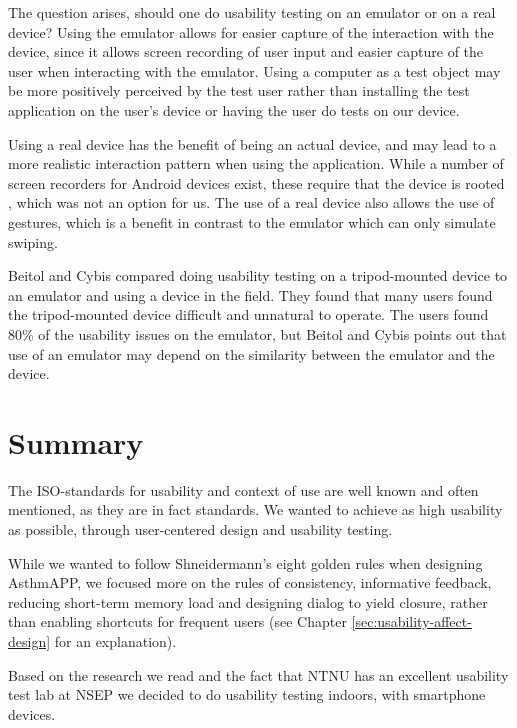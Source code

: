 The question arises, should one do usability testing on an emulator or on a real device?
Using the emulator allows for easier capture of the interaction with the device, since it allows screen recording of user input and easier capture of the user when interacting with the emulator. Using a computer as a test object may be more positively perceived by the test user rather than installing the test application on the user's device or having the user do tests on our device. 

Using a real device has the benefit of being an actual device, and may lead to a more realistic interaction pattern when using the application. While a number of screen recorders for Android devices exist, these require that the device is rooted , which was not an option for us. 
The use of a real device also allows the use of gestures, which is a benefit in contrast to the emulator which can only simulate swiping. 


Beitol and Cybis\cite{betiol2005usability} compared doing usability testing on a tripod-mounted device to an emulator and using a device in the field. They found that many users found the tripod-mounted device difficult and unnatural to operate. The users found 80\% of the usability issues on the emulator, but Beitol and Cybis points out that use of an emulator may depend on the similarity between the emulator and the device. 



\section{Summary}
\label{sec:usabilitysummary}

The ISO-standards for usability and context of use\cite{isousability} are well known and often mentioned, as they are in fact standards. We wanted to achieve as high usability as possible, through user-centered design and usability testing. 

While we wanted to follow Shneidermann's eight golden rules\cite{shneiderman2003designing} when designing AsthmAPP, we focused more on the rules of consistency, informative feedback, reducing short-term memory load and designing dialog to yield closure, rather than enabling shortcuts for frequent users (see Chapter \ref{sec:usability-affect-design} for an explanation).

Based on the research we read and the fact that NTNU has an excellent usability test lab at NSEP we decided to do usability testing indoors, with smartphone devices. 